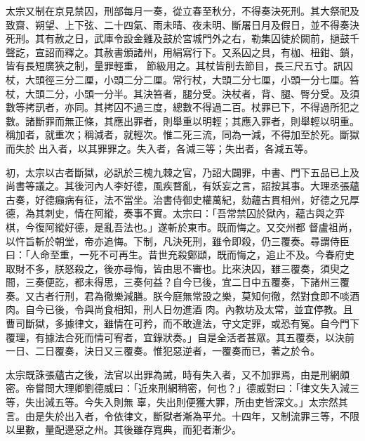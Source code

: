 \begin{pinyinscope}
 太宗又制在京見禁囚，刑部每月一奏，從立春至秋分，不得奏決死刑。其大祭祀及致齋、朔望、上下弦、二十四氣、雨未晴、夜未明、斷屠日月及假日，並不得奏決死刑。其有赦之日，武庫令設金雞及鼓於宮城門外之右，勒集囚徒於闕前，撾鼓千聲訖，宣詔而釋之。其赦書頒諸州，用絹寫行下。又系囚之具，有枷、杻鉗、鎖，皆有長短廣狹之制，量罪輕重，
 節級用之。其杖皆削去節目，長三尺五寸。訊囚杖，大頭徑三分二厘，小頭二分二厘。常行杖，大頭二分七厘，小頭一分七厘。笞杖，大頭二分，小頭一分半。其決笞者，腿分受。決杖者，背、腿、臀分受。及須數等拷訊者，亦同。其拷囚不過三度，總數不得過二百。杖罪已下，不得過所犯之數。諸斷罪而無正條，其應出罪者，則舉重以明輕；其應入罪者，則舉輕以明重。稱加者，就重次；稱減者，就輕次。惟二死三流，同為一減，不得加至於死。斷獄而失於
 出入者，以其罪罪之。失入者，各減三等；失出者，各減五等。



 初，太宗以古者斷獄，必訊於三槐九棘之官，乃詔大闢罪，中書、門下五品已上及尚書等議之。其後河內人李好德，風疾瞀亂，有妖妄之言，詔按其事。大理丞張蘊古奏，好德癲病有征，法不當坐。治書侍御史權萬紀，劾蘊古貫相州，好德之兄厚德，為其刺史，情在阿縱，奏事不實。太宗曰：「吾常禁囚於獄內，蘊古與之弈棋，今復阿縱好德，是亂吾法也。」遂斬於東市。既而悔之。又交州都
 督盧祖尚，以忤旨斬於朝堂，帝亦追悔。下制，凡決死刑，雖令即殺，仍三覆奏。尋謂侍臣曰：「人命至重，一死不可再生。昔世充殺鄭頲，既而悔之，追止不及。今春府史取財不多，朕怒殺之，後亦尋悔，皆由思不審也。比來決囚，雖三覆奏，須臾之間，三奏便訖，都未得思，三奏何益？自今已後，宜二日中五覆奏，下諸州三覆奏。又古者行刑，君為徹樂減膳。朕今庭無常設之樂，莫知何徹，然對食即不啖酒肉。自今已後，令與尚食相知，刑人日勿進酒
 肉。內教坊及太常，並宜停教。且曹司斷獄，多據律文，雖情在可矜，而不敢違法，守文定罪，或恐有冤。自今門下覆理，有據法合死而情可宥者，宜錄狀奏。」自是全活者甚眾。其五覆奏，以決前一日、二日覆奏，決日又三覆奏。惟犯惡逆者，一覆奏而已，著之於令。



 太宗既誅張蘊古之後，法官以出罪為誡，時有失入者，又不加罪焉，由是刑網頗密。帝嘗問大理卿劉德威曰：「近來刑網稍密，何也？」德威對曰：「律文失入減三等，失出減五等。今失入則無
 辜，失出則便獲大罪，所由吏皆深文。」太宗然其言。由是失於出入者，令依律文，斷獄者漸為平允。十四年，又制流罪三等，不限以里數，量配邊惡之州。其後雖存寬典，而犯者漸少。




\end{pinyinscope}
